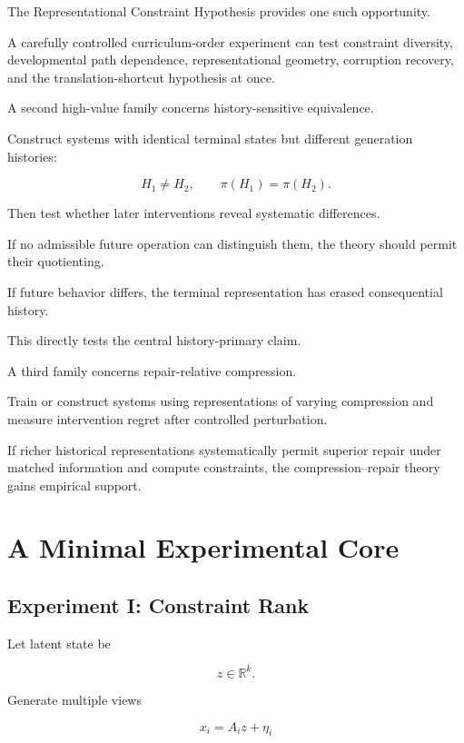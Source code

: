 \documentclass[11pt]{article}
\theoremstyle{remark}
\begin{document}
The Representational Constraint Hypothesis provides one such opportunity.

A carefully controlled curriculum-order experiment can test constraint diversity, developmental path dependence, representational geometry, corruption recovery, and the translation-shortcut hypothesis at once.

A second high-value family concerns history-sensitive equivalence.

Construct systems with identical terminal states but different generation histories:

\begin{equation}
H_1\neq H_2,
\qquad
\pi(H_1)=\pi(H_2).
\end{equation}

Then test whether later interventions reveal systematic differences.

If no admissible future operation can distinguish them, the theory should permit their quotienting.

If future behavior differs, the terminal representation has erased consequential history.

This directly tests the central history-primary claim.

A third family concerns repair-relative compression.

Train or construct systems using representations of varying compression and measure intervention regret after controlled perturbation.

If richer historical representations systematically permit superior repair under matched information and compute constraints, the compression--repair theory gains empirical support.

\section{A Minimal Experimental Core}

\subsection{Experiment I: Constraint Rank}

Let latent state be

\begin{equation}
z\in\mathbb{R}^k.
\end{equation}

Generate multiple views

\begin{equation}
x_i=A_i z+\eta_i
\end{equation}
\end{document}
